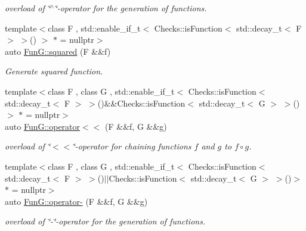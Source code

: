 \begin{DoxyCompactItemize}
\begin{DoxyCompactList}\small\item\em overload of \char`\"{}$^\wedge$\char`\"{}-\/operator for the generation of functions. \end{DoxyCompactList}\item 
{\footnotesize template$<$class F , std\-::enable\-\_\-if\-\_\-t$<$ Checks\-::is\-Function$<$ std\-::decay\-\_\-t$<$ F $>$ $>$() $>$ $\ast$  = nullptr$>$ }\\auto \hyperlink{namespaceFunG_ac4ffc0754104af6ddf114e154251db78}{Fun\-G\-::squared} (F \&\&f)
\begin{DoxyCompactList}\small\item\em Generate squared function. \end{DoxyCompactList}\item 
{\footnotesize template$<$class F , class G , std\-::enable\-\_\-if\-\_\-t$<$ Checks\-::is\-Function$<$ std\-::decay\-\_\-t$<$ F $>$ $>$()\&\&\-Checks\-::is\-Function$<$ std\-::decay\-\_\-t$<$ G $>$ $>$() $>$ $\ast$  = nullptr$>$ }\\auto \hyperlink{namespaceFunG_a65436d4494e99629b0177d0df7634a6b}{Fun\-G\-::operator$<$$<$} (F \&\&f, G \&\&g)
\begin{DoxyCompactList}\small\item\em overload of \char`\"{}$<$$<$\char`\"{}-\/operator for chaining functions $f$ and $g$ to $ f \circ g $. \end{DoxyCompactList}\item 
{\footnotesize template$<$class F , class G , std\-::enable\-\_\-if\-\_\-t$<$ Checks\-::is\-Function$<$ std\-::decay\-\_\-t$<$ F $>$ $>$()$\vert$$\vert$\-Checks\-::is\-Function$<$ std\-::decay\-\_\-t$<$ G $>$ $>$()$>$ $\ast$  = nullptr$>$ }\\auto \hyperlink{namespaceFunG_a3af04c2ef5c1b206feb75fffd298cbbf}{Fun\-G\-::operator-\/} (F \&\&f, G \&\&g)
\begin{DoxyCompactList}\small\item\em overload of \char`\"{}-\/\char`\"{}-\/operator for the generation of functions. \end{DoxyCompactList}\end{DoxyCompactItemize}
